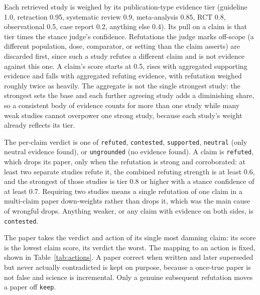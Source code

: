 \documentclass[11pt,a4paper]{article}
\begin{document}
Each retrieved study is weighed by its publication-type evidence tier (guideline 1.0, retraction 0.95, systematic review 0.9, meta-analysis 0.85, RCT 0.8, observational 0.5, case report 0.2, anything else 0.4). Its pull on a claim is that tier times the stance judge's confidence. Refutations the judge marks off-scope (a different population, dose, comparator, or setting than the claim asserts) are discarded first, since such a study refutes a different claim and is not evidence against this one. A claim's score starts at 0.5, rises with aggregated supporting evidence and falls with aggregated refuting evidence, with refutation weighed roughly twice as heavily. The aggregate is not the single strongest study: the strongest sets the base and each further agreeing study adds a diminishing share, so a consistent body of evidence counts for more than one study while many weak studies cannot overpower one strong study, because each study's weight already reflects its tier.

The per-claim verdict is one of \texttt{refuted}, \texttt{contested}, \texttt{supported}, \texttt{neutral} (only neutral evidence found), or \texttt{ungrounded} (no evidence found). A claim is \texttt{refuted}, which drops its paper, only when the refutation is strong and corroborated: at least two separate studies refute it, the combined refuting strength is at least 0.6, and the strongest of those studies is tier 0.8 or higher with a stance confidence of at least 0.7. Requiring two studies means a single refutation of one claim in a multi-claim paper down-weights rather than drops it, which was the main cause of wrongful drops. Anything weaker, or any claim with evidence on both sides, is \texttt{contested}.

The paper takes the verdict and action of its single most damning claim: its score is the lowest claim score, its verdict the worst. The mapping to an action is fixed, shown in Table~\ref{tab:actions}. A paper correct when written and later superseded but never actually contradicted is kept on purpose, because a once-true paper is not false and science is incremental. Only a genuine subsequent refutation moves a paper off \texttt{keep}.
\end{document}
